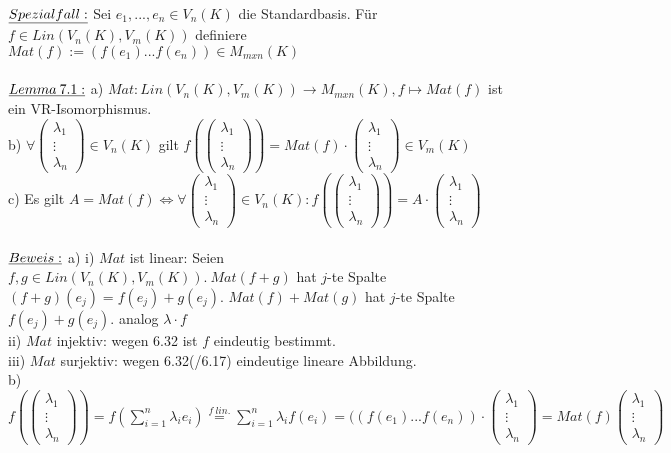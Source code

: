 \documentclass[fleqn, a4paper, 11pt]{scrartcl}
\theoremstyle{definition}
\begin{document}
$\uline{Spezialfall:}$ Sei $e_1,...,e_n\in V_n(K)$ die Standardbasis. Für $f\in Lin(V_n(K),V_m(K))$ definiere $Mat(f):=(f(e_1)...f(e_n))\in M_{mxn}(K)$\\
\\
$\uline{Lemma\:7.1:}$ a) $Mat:Lin(V_n(K),V_m(K))\rightarrow M_{mxn}(K),f\mapsto Mat(f)$ ist ein VR-Isomorphismus.\\
b) $\forall\begin{pmatrix}
	\lambda_1\\
	\vdots\\
	\lambda_n
\end{pmatrix}\in V_n(K)$ gilt $f(\begin{pmatrix}
	\lambda_1\\
	\vdots\\
	\lambda_n
\end{pmatrix})=Mat(f)\cdot\begin{pmatrix}
	\lambda_1\\
	\vdots\\
	\lambda_n
\end{pmatrix}\in V_m(K)$\\
c) Es gilt $A=Mat(f)\Leftrightarrow\forall\begin{pmatrix}
	\lambda_1\\
	\vdots\\
	\lambda_n
\end{pmatrix}\in V_n(K):f(\begin{pmatrix}
	\lambda_1\\
	\vdots\\
	\lambda_n
\end{pmatrix})=A\cdot\begin{pmatrix}
	\lambda_1\\
	\vdots\\
	\lambda_n
\end{pmatrix}$\\
\\
$\uline{Beweis:}$ a) i) $Mat$ ist linear: Seien $f,g\in Lin(V_n(K),V_m(K)).\:Mat(f+g)$ hat $j$-te Spalte $(f+g)(e_j)=f(e_j)+g(e_j)$. $Mat(f)+Mat(g)$ hat $j$-te Spalte $f(e_j)+g(e_j)$. analog $\lambda\cdot f$\\
ii) $Mat$ injektiv: wegen 6.32 ist $f$ eindeutig bestimmt.\\
iii) $Mat$ surjektiv: wegen 6.32(/6.17) eindeutige lineare Abbildung.\\
b) $f(\begin{pmatrix}
	\lambda_1\\
	\vdots\\
	\lambda_n
\end{pmatrix})=f(\sum\limits_{i=1}^n\lambda_i e_i)\stackrel{f\:lin.}{=}\sum\limits_{i=1}^n\lambda_i f(e_i)=((f(e_1)...f(e_n))\cdot\begin{pmatrix}
	\lambda_1\\
	\vdots\\
	\lambda_n
\end{pmatrix}=Mat(f)\begin{pmatrix}
	\lambda_1\\
	\vdots\\
	\lambda_n
\end{pmatrix}$\\
\end{document}

